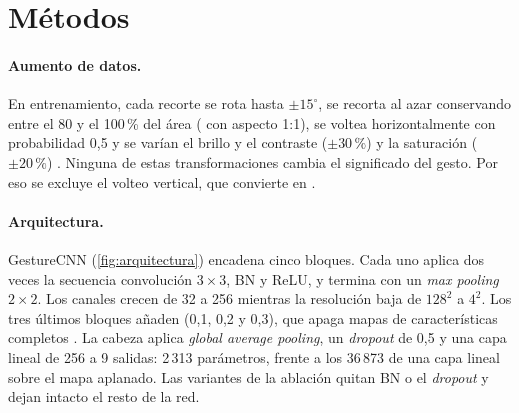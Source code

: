 \section{Métodos}
\label{sec:metodos}

\paragraph{Aumento de datos.}
En entrenamiento, cada recorte se rota hasta $\pm15^\circ$, se recorta al azar conservando entre
el 80 y el 100\,\% del área ( con aspecto 1:1), se voltea horizontalmente
con probabilidad 0,5 y se varían el brillo y el contraste ($\pm30\,\%$) y la saturación
($\pm20\,\%$) \citep{shorten2019augmentation}. Ninguna de estas transformaciones cambia el
significado del gesto. Por eso se excluye el volteo vertical, que convierte  en
.

\paragraph{Arquitectura.}
GestureCNN (\cref{fig:arquitectura}) encadena cinco bloques. Cada uno aplica dos veces la
secuencia convolución $3\times3$, BN y ReLU, y termina con un \emph{max pooling} $2\times2$. Los
canales crecen de 32 a 256 mientras la resolución baja de $128^2$ a $4^2$. Los tres últimos
bloques añaden  (0,1, 0,2 y 0,3), que apaga mapas de características completos
\citep{tompson2015spatialdropout}. La cabeza aplica \emph{global average pooling}, un
\emph{dropout} de 0,5 y una capa lineal de 256 a 9 salidas: 2\,313 parámetros, frente a los
36\,873 de una capa lineal sobre el mapa aplanado. Las variantes de la ablación quitan BN o el
\emph{dropout} y dejan intacto el resto de la red.

